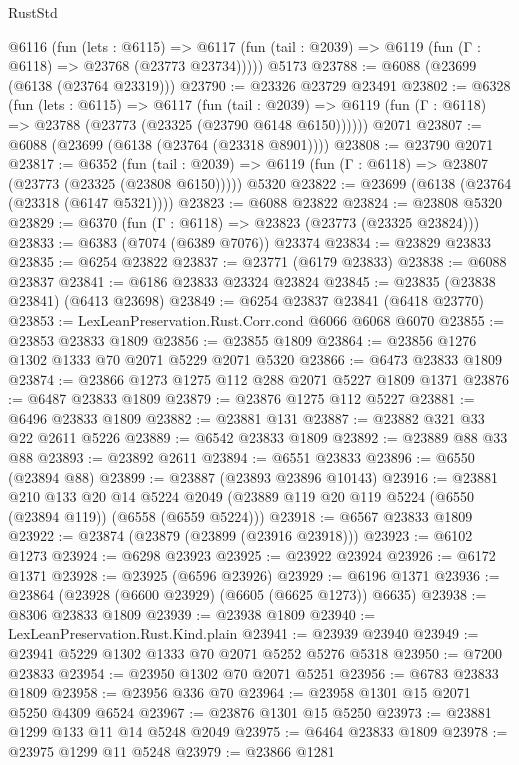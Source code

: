 \begin{lexlean}{RustStd}
\begin{coremodule}
    @6116
      (fun (lets : @6115) =>
      @6117 (fun (tail : @2039) => @6119 (fun (Γ : @6118) => @23768 (@23773 @23734)))))
    @5173
@23788 := @6088 (@23699 (@6138 (@23764 @23319)))
@23790 := @23326 @23729 @23491
@23802 := @6328
    (fun (lets : @6115) =>
    @6117
      (fun (tail : @2039) =>
      @6119 (fun (Γ : @6118) => @23788 (@23773 (@23325 (@23790 @6148 @6150))))))
    @2071
@23807 := @6088 (@23699 (@6138 (@23764 (@23318 @8901))))
@23808 := @23790 @2071
@23817 := @6352
    (fun (tail : @2039) => @6119 (fun (Γ : @6118) => @23807 (@23773 (@23325 (@23808 @6150)))))
    @5320
@23822 := @23699 (@6138 (@23764 (@23318 (@6147 @5321))))
@23823 := @6088 @23822
@23824 := @23808 @5320
@23829 := @6370 (fun (Γ : @6118) => @23823 (@23773 (@23325 @23824)))
@23833 := @6383 (@7074 (@6389 @7076)) @23374
@23834 := @23829 @23833
@23835 := @6254 @23822
@23837 := @23771 (@6179 @23833)
@23838 := @6088 @23837
@23841 := @6186 @23833 @23324 @23824
@23845 := @23835 (@23838 @23841) (@6413 @23698)
@23849 := @6254 @23837 @23841 (@6418 @23770)
@23853 := LexLeanPreservation.Rust.Corr.cond @6066 @6068 @6070
@23855 := @23853 @23833 @1809
@23856 := @23855 @1809
@23864 := @23856 @1276 @1302 @1333 @70 @2071 @5229 @2071 @5320
@23866 := @6473 @23833 @1809
@23874 := @23866 @1273 @1275 @112 @288 @2071 @5227 @1809 @1371
@23876 := @6487 @23833 @1809
@23879 := @23876 @1275 @112 @5227
@23881 := @6496 @23833 @1809
@23882 := @23881 @131
@23887 := @23882 @321 @33 @22 @2611 @5226
@23889 := @6542 @23833 @1809
@23892 := @23889 @88 @33 @88
@23893 := @23892 @2611
@23894 := @6551 @23833
@23896 := @6550 (@23894 @88)
@23899 := @23887 (@23893 @23896 @10143)
@23916 := @23881
    @210
    @133
    @20
    @14
    @5224
    @2049
    (@23889 @119 @20 @119 @5224 (@6550 (@23894 @119)) (@6558 (@6559 @5224)))
@23918 := @6567 @23833 @1809
@23922 := @23874 (@23879 (@23899 (@23916 @23918)))
@23923 := @6102 @1273
@23924 := @6298 @23923
@23925 := @23922 @23924
@23926 := @6172 @1371
@23928 := @23925 (@6596 @23926)
@23929 := @6196 @1371
@23936 := @23864 (@23928 (@6600 @23929) (@6605 (@6625 @1273)) @6635)
@23938 := @8306 @23833 @1809
@23939 := @23938 @1809
@23940 := LexLeanPreservation.Rust.Kind.plain
@23941 := @23939 @23940
@23949 := @23941 @5229 @1302 @1333 @70 @2071 @5252 @5276 @5318
@23950 := @7200 @23833
@23954 := @23950 @1302 @70 @2071 @5251
@23956 := @6783 @23833 @1809
@23958 := @23956 @336 @70
@23964 := @23958 @1301 @15 @2071 @5250 @4309 @6524
@23967 := @23876 @1301 @15 @5250
@23973 := @23881 @1299 @133 @11 @14 @5248 @2049
@23975 := @6464 @23833 @1809
@23978 := @23975 @1299 @11 @5248
@23979 := @23866 @1281

\end{coremodule}
\end{lexlean}
